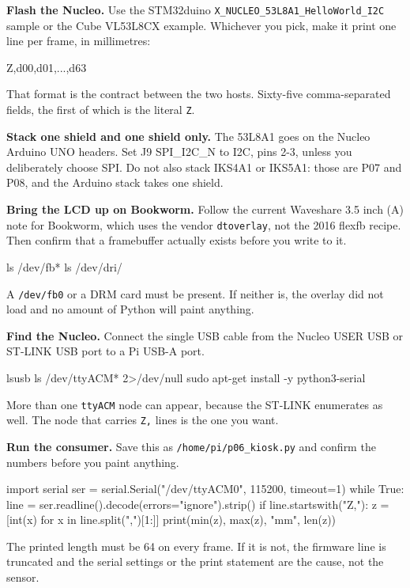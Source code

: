 \begin{steps}
\item \textbf{Flash the Nucleo.} Use the STM32duino
\texttt{X\_NUCLEO\_53L8A1\_HelloWorld\_I2C} sample or the Cube VL53L8CX example. Whichever
you pick, make it print one line per frame, in millimetres:
\begin{plaincode}
Z,d00,d01,...,d63
\end{plaincode}
That format is the contract between the two hosts. Sixty-five comma-separated fields, the
first of which is the literal \texttt{Z}.

\item \textbf{Stack one shield and one shield only.} The 53L8A1 goes on the Nucleo Arduino
UNO headers. Set J9 SPI\_I2C\_N to I2C, pins 2-3, unless you deliberately choose SPI. Do
not also stack IKS4A1 or IKS5A1: those are P07 and P08, and the Arduino stack takes one
shield.

\item \textbf{Bring the LCD up on Bookworm.} Follow the current Waveshare 3.5 inch (A)
note for Bookworm, which uses the vendor \texttt{dtoverlay}, not the 2016 flexfb recipe.
Then confirm that a framebuffer actually exists before you write to it.
\begin{shellcode}
ls /dev/fb*
ls /dev/dri/
\end{shellcode}
A \texttt{/dev/fb0} or a DRM card must be present. If neither is, the overlay did not load
and no amount of Python will paint anything.

\item \textbf{Find the Nucleo.} Connect the single USB cable from the Nucleo USER USB or
ST-LINK USB port to a Pi USB-A port.
\begin{shellcode}
lsusb
ls /dev/ttyACM* 2>/dev/null
sudo apt-get install -y python3-serial
\end{shellcode}
More than one \texttt{ttyACM} node can appear, because the ST-LINK enumerates as well.
The node that carries \texttt{Z,} lines is the one you want.

\item \textbf{Run the consumer.} Save this as \texttt{/home/pi/p06\_kiosk.py} and confirm
the numbers before you paint anything.
\begin{pycode}
import serial
ser = serial.Serial("/dev/ttyACM0", 115200, timeout=1)
while True:
    line = ser.readline().decode(errors="ignore").strip()
    if line.startswith("Z,"):
        z = [int(x) for x in line.split(",")[1:]]
        print(min(z), max(z), "mm", len(z))
\end{pycode}
The printed length must be 64 on every frame. If it is not, the firmware line is truncated
and the serial settings or the print statement are the cause, not the sensor.


\end{steps}
